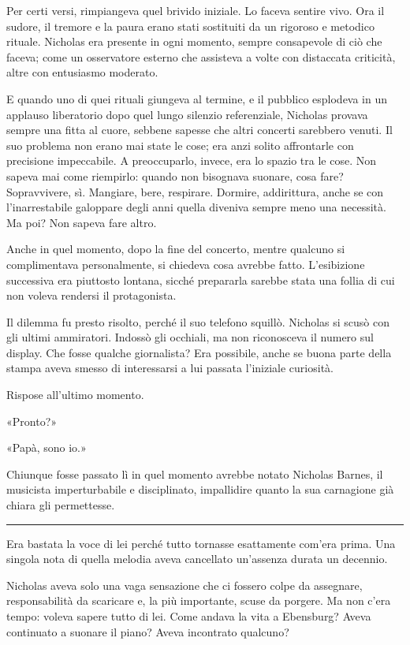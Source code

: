 \documentclass[a4paper,oneside,11pt]{memoir}
\begin{document}
Per certi versi, rimpiangeva quel brivido iniziale. Lo faceva sentire vivo. Ora
il sudore, il tremore e la paura erano stati sostituiti da un rigoroso e
metodico rituale. Nicholas era presente in ogni momento, sempre consapevole di
ciò che faceva; come un osservatore esterno che assisteva a volte con distaccata
criticità, altre con entusiasmo moderato.

E quando uno di quei rituali giungeva al termine, e il pubblico esplodeva in un
applauso liberatorio dopo quel lungo silenzio referenziale, Nicholas provava
sempre una fitta al cuore, sebbene sapesse che altri concerti sarebbero venuti.
Il suo problema non erano mai state le cose; era anzi solito affrontarle con
precisione impeccabile. A preoccuparlo, invece, era lo spazio tra le cose. Non
sapeva mai come riempirlo: quando non bisognava suonare, cosa fare?
Sopravvivere, sì. Mangiare, bere, respirare. Dormire, addirittura, anche se con
l'inarrestabile galoppare degli anni quella diveniva sempre meno una necessità.
Ma poi? Non sapeva fare altro.

Anche in quel momento, dopo la fine del concerto, mentre qualcuno si
complimentava personalmente, si chiedeva cosa avrebbe fatto. L'esibizione
successiva era piuttosto lontana, sicché prepararla sarebbe stata una follia di
cui non voleva rendersi il protagonista.

Il dilemma fu presto risolto, perché il suo telefono squillò. Nicholas si scusò
con gli ultimi ammiratori. Indossò gli occhiali, ma non riconosceva il numero
sul display. Che fosse qualche giornalista? Era possibile, anche se buona parte
della stampa aveva smesso di interessarsi a lui passata l'iniziale curiosità.

Rispose all'ultimo momento.

«Pronto?»

«Papà, sono io.»

Chiunque fosse passato lì in quel momento avrebbe notato Nicholas Barnes, il
musicista imperturbabile e disciplinato, impallidire quanto la sua carnagione
già chiara gli permettesse.

\plainbreak{1}

Era bastata la voce di lei perché tutto tornasse esattamente com'era prima. Una
singola nota di quella melodia aveva cancellato un'assenza durata un decennio.

Nicholas aveva solo una vaga sensazione che ci fossero colpe da assegnare,
responsabilità da scaricare e, la più importante, scuse da porgere. Ma non c'era
tempo: voleva sapere tutto di lei. Come andava la vita a Ebensburg? Aveva
continuato a suonare il piano? Aveva incontrato qualcuno?
\end{document}
